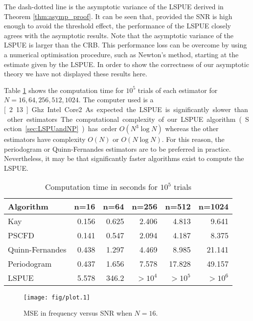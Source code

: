 \documentclass[journal]{IEEEtran}
\begin{document}
The dash-dotted line is the asymptotic variance of the LSPUE derived in
Theorem \ref{thm:asymp_proof}.  It can be seen that, provided the SNR is high
enough to avoid the threshold effect, the performance of the LSPUE closely
agrees with the asymptotic results.  Note that the asymptotic variance of the LSPUE is larger than the CRB.  This performance loss can be overcome by using a numerical optimisation procedure, such as Newton's method, starting at the estimate given by the LSPUE.  In order to show the correctness of our asymptotic theory we have not displayed these results here.

Table \ref{tab_computation_time} shows the computation time for $10^5$ trials of each estimator for $N=16,64,256,512,1024$. The computer used is a \unit[2.13]{Ghz} Intel Core2. As expected the LSPUE is significantly slower than other estimators. The computational complexity of our LSPUE algorithm (Section \ref{sec:LSPUandNP}) has order $O(N^3\log{N})$ whereas the other estimators have complexity $O(N)$ or $O(N\log{N})$.  For this reason, the periodogram or Quinn-Fernandes estimators are to be preferred in practice. Nevertheless, it may be that significantly faster algorithms exist to compute the LSPUE.

\begin{table}[h]
\centering
\caption{Computation time in seconds for $10^5$ trials}
\begin{tabular}{lrrrrr}
Algorithm & \multicolumn{1}{l}{n=16} & \multicolumn{1}{l}{n=64} & \multicolumn{1}{l}{n=256} & \multicolumn{1}{l}{n=512} & \multicolumn{1}{l}{n=1024} \\ \toprule
Kay  & 0.156 & 0.625 & 2.406 & 4.813 & 9.641\\ 
PSCFD  & 0.141 & 0.547 & 2.094 & 4.187 & 8.375\\ 
Quinn-Fernandes  & 0.438 & 1.297 & 4.469 & 8.985 & 21.141\\ 
Periodogram & 0.437 & 1.656 & 7.578 & 17.828 & 49.157\\
LSPUE & 5.578 & 346.2 & $>10^4$ & $>10^5$ & $>10^6$ \\ \bottomrule
\end{tabular}
\label{tab_computation_time}
\end{table}

\begin{figure}[htbp]
	\centering
		\texttt{[image: fig/plot.1]}
		\caption{MSE in frequency versus SNR when $N=16$.}
		\label{plot:MSEvSNRn=16}
\end{figure}
\end{document}

